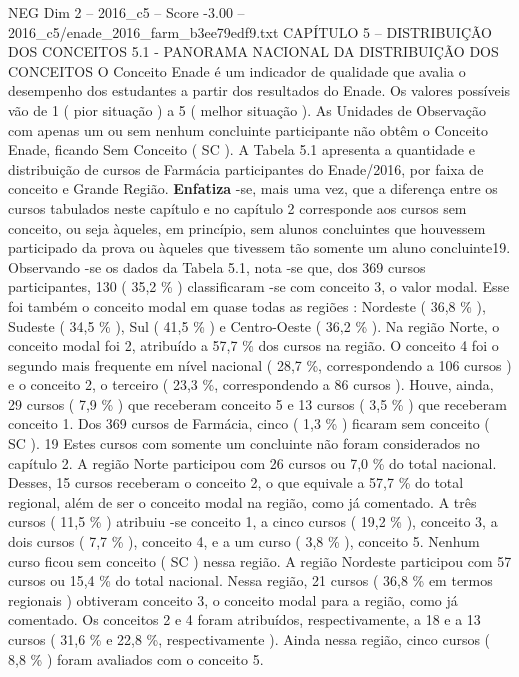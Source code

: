 \begin{textsample}{NEG Dim 2 – 2016\_c5 – Score -3.00 – 2016\_c5/enade\_2016\_farm\_b3ee79edf9.txt}  \label{ex:f2_neg_031}
CAPÍTULO 5 – DISTRIBUIÇÃO DOS CONCEITOS 5.1 - PANORAMA NACIONAL DA DISTRIBUIÇÃO DOS CONCEITOS O Conceito Enade é um indicador de qualidade que avalia o desempenho dos estudantes a partir dos resultados do Enade.
Os valores possíveis vão de 1 ( pior situação ) a 5 ( melhor situação ).
As Unidades de Observação com apenas um ou sem nenhum concluinte participante não obtêm o Conceito Enade, ficando Sem Conceito ( SC ).
A Tabela 5.1 apresenta a quantidade e distribuição de cursos de Farmácia participantes do Enade/2016, por faixa de conceito e Grande Região. \textbf{Enfatiza} -se, mais uma vez, que a diferença entre os cursos tabulados neste capítulo e no capítulo 2 corresponde aos cursos sem conceito, ou seja àqueles, em princípio, sem alunos concluintes que houvessem participado da prova ou àqueles que tivessem tão somente um aluno concluinte19.
Observando -se os dados da Tabela 5.1, nota -se que, dos 369 cursos participantes, 130 ( 35,2 \% ) classificaram -se com conceito 3, o valor modal.
Esse foi também o conceito modal em quase todas as regiões : Nordeste ( 36,8 \% ), Sudeste ( 34,5 \% ), Sul ( 41,5 \% ) e Centro-Oeste ( 36,2 \% ).
Na região Norte, o conceito modal foi 2, atribuído a 57,7 \% dos cursos na região.
O conceito 4 foi o segundo mais frequente em nível nacional ( 28,7 \%, correspondendo a 106 cursos ) e o conceito 2, o terceiro ( 23,3 \%, correspondendo a 86 cursos ).
Houve, ainda, 29 cursos ( 7,9 \% ) que receberam conceito 5 e 13 cursos ( 3,5 \% ) que receberam conceito 1.
Dos 369 cursos de Farmácia, cinco ( 1,3 \% ) ficaram sem conceito ( SC ). 19 Estes cursos com somente um concluinte não foram considerados no capítulo 2.
A região Norte participou com 26 cursos ou 7,0 \% do total nacional.
Desses, 15 cursos receberam o conceito 2, o que equivale a 57,7 \% do total regional, além de ser o conceito modal na região, como já comentado.
A três cursos ( 11,5 \% ) atribuiu -se conceito 1, a cinco cursos ( 19,2 \% ), conceito 3, a dois cursos ( 7,7 \% ), conceito 4, e a um curso ( 3,8 \% ), conceito 5.
Nenhum curso ficou sem conceito ( SC ) nessa região.
A região Nordeste participou com 57 cursos ou 15,4 \% do total nacional.
Nessa região, 21 cursos ( 36,8 \% em termos regionais ) obtiveram conceito 3, o conceito modal para a região, como já comentado.
Os conceitos 2 e 4 foram atribuídos, respectivamente, a 18 e a 13 cursos ( 31,6 \% e 22,8 \%, respectivamente ).
Ainda nessa região, cinco cursos ( 8,8 \% ) foram avaliados com o conceito 5.

\end{textsample}

